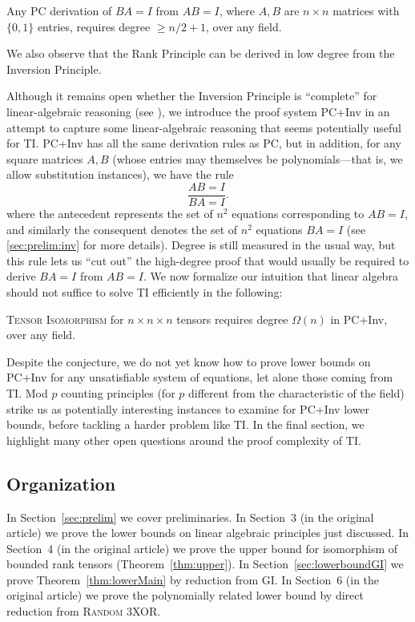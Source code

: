 \begin{theorem}
Any PC derivation of $BA = I$ from $AB=I$, where $A,B$ are $n \times n$ matrices with $\{0,1\}$ entries, requires degree $\geq n/2+1$, over any field.
\end{theorem}

We also observe that the Rank Principle can be derived in low degree from the Inversion Principle. 

Although it remains open whether the Inversion Principle is ``complete'' for linear-algebraic reasoning (see \cite{soltys, SC}), we introduce the proof system PC+Inv in an attempt to capture some linear-algebraic reasoning that seems potentially useful for \textsc{TI}. PC+Inv has all the same derivation rules as PC, but in addition, for any square matrices $A,B$ (whose entries may themselves be polynomials---that is, we allow substitution instances), we have the rule
\[
\frac{AB=I}{BA=I}.
\]
where the antecedent represents the set of $n^2$ equations corresponding to $AB=I$, and similarly the consequent denotes the set of $n^2$ equations $BA=I$ (see \ref{sec:prelim:inv} for more details). Degree is still measured in the usual way, but this rule lets us ``cut out'' the high-degree proof that would usually be required to derive $BA=I$ from $AB=I$. We now formalize our intuition that linear algebra should not suffice to solve \textsc{TI} efficiently in the following:

\begin{conjecture} \label{conj:inv}
\textsc{Tensor Isomorphism} for $n \times n \times n$ tensors requires degree $\Omega(n)$ in PC+Inv, over any field.
\end{conjecture}

Despite the conjecture, we do not yet know how to prove lower bounds on PC+Inv for any unsatisfiable system of equations, let alone those coming from \textsc{TI}. Mod $p$ counting principles (for $p$ different from the characteristic of the field) strike us as potentially interesting instances to examine for PC+Inv lower bounds, before tackling a harder problem like \textsc{TI}. In the final section, we highlight many other open questions around the proof complexity of \textsc{TI}.

\subsection{Organization}
In Section~\ref{sec:prelim} we cover preliminaries. In Section~3 (in the original article) we prove the lower bounds on linear algebraic principles just discussed. In Section~4 (in the original article) we prove the upper bound for isomorphism of bounded rank tensors (Theorem~\ref{thm:upper}). In Section~\ref{sec:lowerboundGI} we prove Theorem~\ref{thm:lowerMain} by reduction from \textsc{GI}. In Section~6 (in the original article) we prove the polynomially related lower bound by direct reduction from \textsc{Random 3XOR}.
